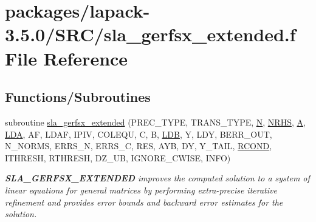 \hypertarget{sla__gerfsx__extended_8f}{}\section{packages/lapack-\/3.5.0/\+S\+R\+C/sla\+\_\+gerfsx\+\_\+extended.f File Reference}
\label{sla__gerfsx__extended_8f}
\subsection*{Functions/\+Subroutines}
\begin{DoxyCompactItemize}
\item 
subroutine \hyperlink{group__realGEcomputational_ga2532e63c32caabae5b7d18e8036514f4}{sla\+\_\+gerfsx\+\_\+extended} (P\+R\+E\+C\+\_\+\+T\+Y\+P\+E, T\+R\+A\+N\+S\+\_\+\+T\+Y\+P\+E, \hyperlink{polmisc_8c_a0240ac851181b84ac374872dc5434ee4}{N}, \hyperlink{example__user_8c_aa0138da002ce2a90360df2f521eb3198}{N\+R\+H\+S}, \hyperlink{classA}{A}, \hyperlink{example__user_8c_ae946da542ce0db94dced19b2ecefd1aa}{L\+D\+A}, A\+F, L\+D\+A\+F, I\+P\+I\+V, C\+O\+L\+E\+Q\+U, C, B, \hyperlink{example__user_8c_a50e90a7104df172b5a89a06c47fcca04}{L\+D\+B}, Y, L\+D\+Y, B\+E\+R\+R\+\_\+\+O\+U\+T, N\+\_\+\+N\+O\+R\+M\+S, E\+R\+R\+S\+\_\+\+N, E\+R\+R\+S\+\_\+\+C, R\+E\+S, A\+Y\+B, D\+Y, Y\+\_\+\+T\+A\+I\+L, \hyperlink{superlu__enum__consts_8h_af00a42ecad444bbda75cde1b64bd7e72a9b5c151728d8512307565994c89919d5}{R\+C\+O\+N\+D}, I\+T\+H\+R\+E\+S\+H, R\+T\+H\+R\+E\+S\+H, D\+Z\+\_\+\+U\+B, I\+G\+N\+O\+R\+E\+\_\+\+C\+W\+I\+S\+E, I\+N\+F\+O)
\begin{DoxyCompactList}\small\item\em {\bfseries S\+L\+A\+\_\+\+G\+E\+R\+F\+S\+X\+\_\+\+E\+X\+T\+E\+N\+D\+E\+D} improves the computed solution to a system of linear equations for general matrices by performing extra-\/precise iterative refinement and provides error bounds and backward error estimates for the solution. \end{DoxyCompactList}\end{DoxyCompactItemize}
